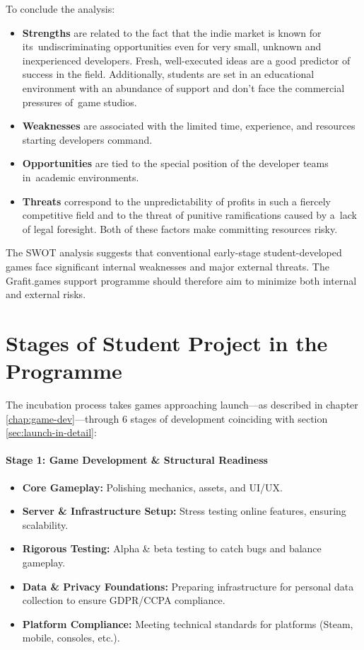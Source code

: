 To conclude the analysis:
\begin{itemize}
    \item \textbf{Strengths} are related to the fact that the indie market is known for its~undiscriminating opportunities even for very small, unknown and inexperienced developers. Fresh, well-executed ideas are a good predictor of success in the field. Additionally, students are set in an educational environment with an abundance of support and don’t face the commercial pressures of~game studios.
    \item \textbf{Weaknesses} are associated with the limited time, experience, and resources starting developers command. 
    \item \textbf{Opportunities} are tied to the special position of the developer teams in~academic environments.
    \item \textbf{Threats} correspond to the unpredictability of profits in such a fiercely competitive field and to the threat of punitive ramifications caused by a~lack of legal foresight. Both of these factors make committing resources risky.
\end{itemize}
The SWOT analysis suggests that conventional early-stage student-developed games face significant internal weaknesses and major external threats. The Grafit.games support programme should therefore aim to minimize both internal and external risks.

\section{Stages of Student Project in the Programme}\label{sec:programme-stages}
The incubation process takes games approaching launch—as described in chapter \ref{chap:game-dev}---through 6 stages of development coinciding with section \ref{sec:launch-in-detail}:
\paragraph{\large Stage 1: Game Development \& Structural Readiness}
\begin{itemize}
    \item \textbf{Core Gameplay:} Polishing mechanics, assets, and UI/UX.
    \item \textbf{Server \& Infrastructure Setup:} Stress testing online features, ensuring scalability.
    \item \textbf{Rigorous Testing:} Alpha \& beta testing to catch bugs and balance gameplay.
    \item \textbf{Data \& Privacy Foundations:} Preparing infrastructure for personal data collection to ensure GDPR/CCPA compliance.
    \item \textbf{Platform Compliance:} Meeting technical standards for platforms (Steam, mobile, consoles, etc.).
\end{itemize}
